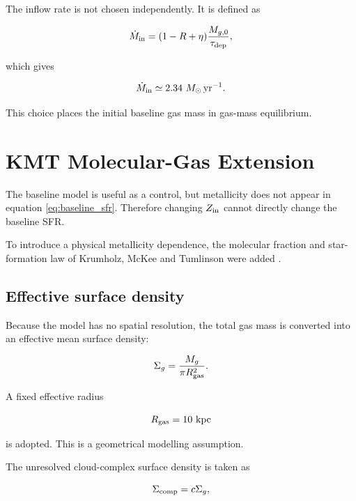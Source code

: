 \documentclass[10pt,a4paper]{article}
\newcommand{\Mgin}{\dot{M}_{\mathrm{in}}}
\begin{document}
The inflow rate is not chosen independently. It is defined as

\begin{equation}
\Mgin
=
(1-R+\eta)
\frac{M_{g,0}}{\tau_{\rm dep}},
\end{equation}

which gives

\begin{equation}
\Mgin
\simeq
2.34~M_\odot\,{\rm yr}^{-1}.
\end{equation}

This choice places the initial baseline gas mass in gas-mass equilibrium.

\section{KMT Molecular-Gas Extension}

The baseline model is useful as a control, but metallicity does not appear in equation \ref{eq:baseline_sfr}. Therefore changing \(Z_{\rm in}\) cannot directly change the baseline SFR.

To introduce a physical metallicity dependence, the molecular fraction and star-formation law of Krumholz, McKee and Tumlinson were added \cite{kmt2008,kmt2009ii,kmt2009sf}.

\subsection{Effective surface density}

Because the model has no spatial resolution, the total gas mass is converted into an effective mean surface density:

\begin{equation}
\Sigma_g
=
\frac{M_g}
{\pi R_{\rm gas}^2}.
\label{eq:sigma}
\end{equation}

A fixed effective radius

\begin{equation}
R_{\rm gas}=10~{\rm kpc}
\end{equation}

is adopted. This is a geometrical modelling assumption.

The unresolved cloud-complex surface density is taken as

\begin{equation}
\Sigma_{\rm comp}=c\Sigma_g,
\end{equation}
\end{document}
